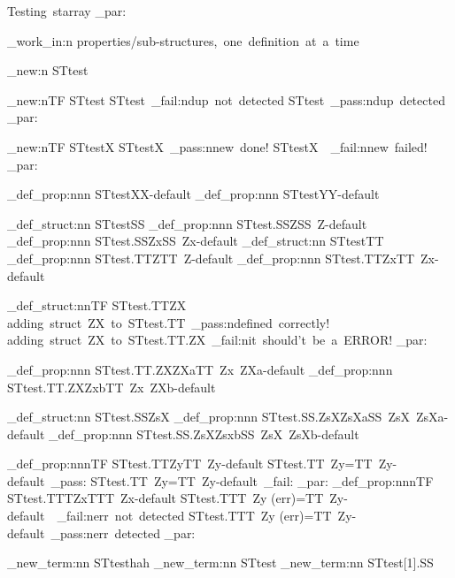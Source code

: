 \documentclass{article}
\begin{document}



%


\par\noindent
{\sc Testing~starray}
\sttests_par:

\sttests_work_in:n {properties/sub-structures,~one~definition~at~a~time}

\starray_new:n {STtest}

\starray_new:nTF {STtest}
  {STtest~\sttests_fail:n{dup~not~detected}}
  {STtest~\sttests_pass:n{dup~detected}}
\sttests_par:

\starray_new:nTF {STtestX}
  {STtestX~\sttests_pass:n{new~done!}}
  {STtestX~~\sttests_fail:n{new~failed!}}
\sttests_par:

\starray_def_prop:nnn {STtest}{X}{X-default}
\starray_def_prop:nnn {STtest}{Y}{Y-default}

\starray_def_struct:nn {STtest}{SS}
\starray_def_prop:nnn {STtest.SS}{Z}{SS~Z-default}
\starray_def_prop:nnn {STtest.SS}{Zx}{SS~Zx-default}
\starray_def_struct:nn {STtest}{TT}
\starray_def_prop:nnn {STtest.TT}{Z}{TT~Z-default}
\starray_def_prop:nnn {STtest.TT}{Zx}{TT~Zx-default}

\starray_def_struct:nnTF {STtest.TT}{ZX}
  {adding~struct~ZX~to~STtest.TT~\sttests_pass:n{defined~correctly!}}
  {adding~struct~ZX~to~STtest.TT.ZX~\sttests_fail:n{it~should't~be~a~ERROR!}}
\sttests_par:
  
\starray_def_prop:nnn {STtest.TT.ZX}{ZXa}{TT~Zx~ZXa-default}
\starray_def_prop:nnn {STtest.TT.ZX}{Zxb}{TT~Zx~ZXb-default}

\starray_def_struct:nn {STtest.SS}{ZsX}
\starray_def_prop:nnn {STtest.SS.ZsX}{ZsXa}{SS~ZsX~ZsXa-default}
\starray_def_prop:nnn {STtest.SS.ZsX}{Zsxb}{SS~ZsX~ZsXb-default}

\starray_def_prop:nnnTF {STtest.TT}{Zy}{TT~Zy-default}
  {STtest.TT~Zy=TT~Zy-default~\sttests_pass:}
  {STtest.TT~Zy=TT~Zy-default~\sttests_fail:}
\sttests_par:
\starray_def_prop:nnnTF {STtest.TTT}{Zx}{TTT~Zx-default}
  {STtest.TTT~Zy (err)=TT~Zy-default~~\sttests_fail:n{err~not~detected}}
  {STtest.TTT~Zy (err)=TT~Zy-default~\sttests_pass:n{err~detected}}
\sttests_par:

\starray_new_term:nn {STtest}{hah}
\starray_new_term:nn {STtest}{}
\starray_new_term:nn {STtest[1].SS}{}
\end{document}
